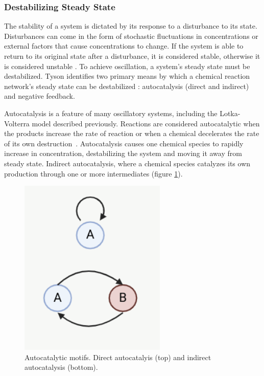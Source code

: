 \documentclass[12pt]{report}
\begin{document}
\subsubsection{Destabilizing Steady State}
The stability of a system is dictated by its response to a disturbance to its state. Disturbances can come in the form of stochastic fluctuations in concentrations or external factors that cause concentrations to change. If the system is able to return to its original state after a disturbance, it is considered stable, otherwise it is considered unstable \cite{sauro_network_2009}. To achieve oscillation, a system's steady state must be destabilized. Tyson identifies two primary means by which a chemical reaction network's steady state can be destabilized \cite{Tyson1975}: autocatalysis (direct and indirect) and negative feedback. 

Autocatalysis is a feature of many oscillatory systems, including the Lotka-Volterra model described previously. Reactions are considered autocatalytic when the products increase the rate of reaction or when a chemical decelerates the rate of its own destruction~\cite{Tyson2004}. Autocatalysis causes one chemical species to rapidly increase in concentration, destabilizing the system and moving it away from steady state. Indirect autocatalysis, where a chemical species catalyzes its own production through one or more intermediates (figure \ref{fig:autocatalysis_motif}).

\begin{figure}
    \centering
    \includegraphics[width=7cm]{images/autocatalytic_motif.png}
    \caption[Autocatalytic motifs]{Autocatalytic motifs. Direct autocatalyis (top) and indirect autocatalysis (bottom).}
    \label{fig:autocatalysis_motif}
\end{figure}
\end{document}

